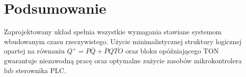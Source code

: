 \documentclass[11pt, a4paper]{article}
\begin{document}
\section{Podsumowanie}
Zaprojektowany układ spełnia wszystkie wymagania stawiane systemom wbudowanym czasu rzeczywistego. Użycie minimalistycznej struktury logicznej opartej na równaniu $Q^+ = P \bar{Q} + \bar{P} Q \overline{TO}$ oraz bloku opóźniającego TON gwarantuje niezawodną pracę oraz optymalne zużycie zasobów mikrokontrolera lub sterownika PLC.
\end{document}
